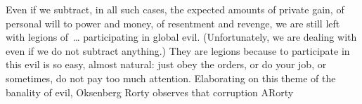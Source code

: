 Even if we subtract, in all such cases, the expected amounts of private gain, of
personal will to power and money, of resentment and revenge, we are still left
with legions of~\ldots {} participating in global evil.
(Unfortunately, we are dealing with  even if we do not
subtract anything.) They are legions because to participate in this evil is so
easy, almost natural: just obey the orders, or do your job, or sometimes, do not
pay too much attention. Elaborating on this theme of the banality of evil,
Oksenberg Rorty observes that 
corruption \citet{can begin with the perception of injury or threat; or with a
  vision of what seems a tantalizing good. A society can become so pervasively
  corrupt that its members can typically fail to recognise their
  viciousness.}{ARorty}{}

